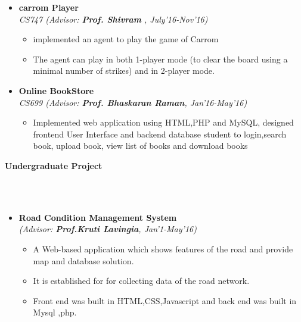 \documentclass[a4paper,10pt]{article}
\newcommand{\isep}{-2 pt}
\newcommand{\lsep}{-0.5cm}
\newcommand{\resheading}[1]{{\small \colorbox{mygrey}{\begin{minipage}{0.975\textwidth}{\textbf{#1 \vphantom{p\^{E}}}}\end{minipage}}}}
\begin{document}
\begin{itemize}
\item \textbf{carrom  Player} \\
\emph{CS747 (Advisor: \textbf{Prof. Shivram }, July'16-Nov'16)}\\[-0.6cm]
      \begin{itemize}\itemsep \isep
	    \item  implemented an agent to play the game of Carrom
	    \item The agent can play in both 1-player mode (to clear the board using a minimal number of strikes) and in 2-player mode.


      \end{itemize}
\end{itemize}
\begin{itemize}
\item \textbf{Online BookStore} \\
\emph{CS699 (Advisor: \textbf{Prof. Bhaskaran Raman}, Jan'16-May'16)}\\[-0.6cm]
      \begin{itemize}\itemsep \isep
	    \item  Implemented web application using HTML,PHP and MySQL, designed frontend User Interface and backend database
		\itemAllowed student to login,search book, upload book, view list of books and download books	
      \end{itemize}
\end{itemize}


\clearpage

\resheading{\textbf{\large Undergraduate Project} }\\[\lsep]\\[-0.3cm]
\begin{itemize}
\item \textbf{Road Condition Management System}\\
 \emph{(Advisor: \textbf{Prof.Kruti Lavingia}, Jan'1-May'16)} \\[-0.6cm]
      \begin{itemize}\itemsep \isep
	    \item A Web-based application which shows features of the road and provide map and database solution.
		 \item It is established for for collecting data of the road network. 
		 \item Front end was built in HTML,CSS,Javascript  and back end was built in Mysql ,php.
\end{itemize}
\end{itemize}
\end{document}
